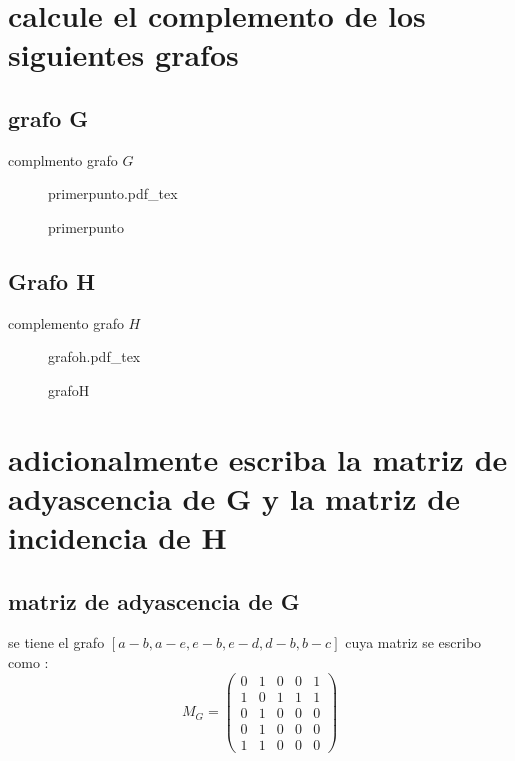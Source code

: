 \documentclass[10pt,a4paper]{article} %
\newcommand{\incfig}[1]{%
    \def\svgwidth{\columnwidth}
    {#1.pdf_tex}
}
\begin{document}
    \title{\rmfamily\normalfont{}}
    \author{}
    \date{\today}

    \maketitle

    \section{calcule el complemento de los siguientes grafos}
        \subsection{grafo G}
            complmento grafo $ G  $
            \\
            \begin{figure}[h]
                \centering
                \incfig{primerpunto}
                \caption{primerpunto}
                \label{fig:grafo G}
            \end{figure}
        \subsection{Grafo H}
            complemento grafo $ H  $
            \\
            \begin{figure}[h]
                \centering
                \incfig{grafoh}
                \caption{grafoH}
                \label{fig:grafo H}
            \end{figure}
    \section{adicionalmente escriba la matriz de adyascencia de G y la matriz de incidencia de H}
        \subsection{matriz de adyascencia de G}
        se tiene el grafo $ [a-b,a-e , e-b ,e-d ,d-b , b-c]  $
        cuya matriz se escribo como :
        \begin{equation}
            M_G = \begin{pmatrix}
                 0 & 1 & 0 & 0 & 1
                \\1 & 0 & 1 & 1 & 1
                \\0 & 1 & 0 & 0 & 0
                \\0 & 1 & 0 & 0 & 0
                \\1 & 1 & 0 & 0 & 0
            \end{pmatrix}
        \end{equation}
\end{document}
